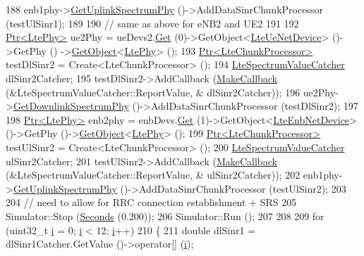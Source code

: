 \begin{DoxyCode}
188   enb1phy->\hyperlink{classns3_1_1LtePhy_aa17612c41d80653ed556431eedef4304}{GetUplinkSpectrumPhy} ()->AddDataSinrChunkProcessor (testUlSinr1);
189 
190   \textcolor{comment}{// same as above for eNB2 and UE2}
191 
192   \hyperlink{classns3_1_1Ptr}{Ptr<LtePhy>} ue2Phy = ueDevs2.\hyperlink{classns3_1_1NetDeviceContainer_a677d62594b5c9d2dea155cc5045f4d0b}{Get} (0)->GetObject<\hyperlink{classns3_1_1LteUeNetDevice}{LteUeNetDevice}> ()->GetPhy ()
      ->\hyperlink{classns3_1_1Object_a13e18c00017096c8381eb651d5bd0783}{GetObject}<\hyperlink{classns3_1_1LtePhy}{LtePhy}> ();
193   \hyperlink{classns3_1_1Ptr}{Ptr<LteChunkProcessor>} testDlSinr2 = Create<LteChunkProcessor> ();
194   \hyperlink{classns3_1_1LteSpectrumValueCatcher}{LteSpectrumValueCatcher} dlSinr2Catcher;
195   testDlSinr2->AddCallback (\hyperlink{group__makecallbackmemptr_ga9376283685aa99d204048d6a4b7610a4}{MakeCallback} (&LteSpectrumValueCatcher::ReportValue, &
      dlSinr2Catcher));
196   ue2Phy->\hyperlink{classns3_1_1LtePhy_a9560f8862545c7c5760e7f6737c5b938}{GetDownlinkSpectrumPhy} ()->AddDataSinrChunkProcessor (testDlSinr2);
197 
198   \hyperlink{classns3_1_1Ptr}{Ptr<LtePhy>} enb2phy = enbDevs.\hyperlink{classns3_1_1NetDeviceContainer_a677d62594b5c9d2dea155cc5045f4d0b}{Get} (1)->GetObject<\hyperlink{classns3_1_1LteEnbNetDevice}{LteEnbNetDevice}> ()->GetPhy
       ()->\hyperlink{classns3_1_1Object_a13e18c00017096c8381eb651d5bd0783}{GetObject}<\hyperlink{classns3_1_1LtePhy}{LtePhy}> ();
199   \hyperlink{classns3_1_1Ptr}{Ptr<LteChunkProcessor>} testUlSinr2 = Create<LteChunkProcessor> ();
200   \hyperlink{classns3_1_1LteSpectrumValueCatcher}{LteSpectrumValueCatcher} ulSinr2Catcher;
201   testUlSinr2->AddCallback (\hyperlink{group__makecallbackmemptr_ga9376283685aa99d204048d6a4b7610a4}{MakeCallback} (&LteSpectrumValueCatcher::ReportValue, &
      ulSinr2Catcher));
202   enb1phy->\hyperlink{classns3_1_1LtePhy_aa17612c41d80653ed556431eedef4304}{GetUplinkSpectrumPhy} ()->AddDataSinrChunkProcessor (testUlSinr2);
203 
204 \textcolor{comment}{// need to allow for RRC connection establishment + SRS}
205   Simulator::Stop (\hyperlink{group__timecivil_ga33c34b816f8ff6628e33d5c8e9713b9e}{Seconds} (0.200));
206   Simulator::Run ();
207 
208 
209   \textcolor{keywordflow}{for} (uint32\_t \hyperlink{bernuolliDistribution_8m_a6f6ccfcf58b31cb6412107d9d5281426}{i} = 0; \hyperlink{bernuolliDistribution_8m_a6f6ccfcf58b31cb6412107d9d5281426}{i} < 12; \hyperlink{bernuolliDistribution_8m_a6f6ccfcf58b31cb6412107d9d5281426}{i}++)
210     \{
211       \textcolor{keywordtype}{double} dlSinr1 = dlSinr1Catcher.GetValue ()->operator[] (\hyperlink{bernuolliDistribution_8m_a6f6ccfcf58b31cb6412107d9d5281426}{i});

\end{DoxyCode}
